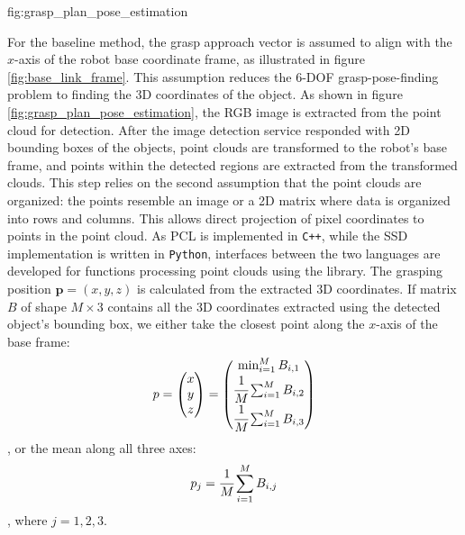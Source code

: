              {fig:grasp_plan_pose_estimation}{\textwidth}

For the baseline method, the grasp approach vector is assumed to align with the $ x $-axis of the robot base coordinate
frame, as illustrated in figure \ref{fig:base_link_frame}. This assumption reduces the 6-DOF grasp-pose-finding problem
to finding the 3D coordinates of the object. As shown in figure \ref{fig:grasp_plan_pose_estimation}, the RGB image is
extracted from the point cloud for detection. After the image detection service responded with 2D bounding boxes of the
objects, point clouds are transformed to the robot's base frame, and points within the detected regions are extracted
from the transformed clouds. This step relies on the second assumption that the point clouds are organized: the points
resemble an image or a 2D matrix where data is organized into rows and columns. This allows direct projection of pixel
coordinates to points in the point cloud. As PCL is implemented in \texttt{C++}, while the SSD implementation is
written in \texttt{Python}, interfaces between the two languages are developed for functions processing point clouds
using the  library. The
grasping position $ \mathbf{p} = (x, y, z) $ is calculated from the extracted 3D coordinates. If matrix $ B $ of shape
$ M \times 3 $ contains all the 3D coordinates extracted using the detected object's bounding box, we either take the
closest point along the $ x $-axis of the base frame:
\begin{equation} \label{eq:pose_estimation_min}
    p = \left( \begin{matrix}
    x \\ y \\ z
    \end{matrix} \right) =
    \left( \begin{matrix}
    \min_{i = 1}^M B_{i,1} \\
    \cfrac{1}{M} \sum_{i = 1}^{M} B_{i,2} \\
    \cfrac{1}{M} \sum_{i = 1}^{M} B_{i,3}
    \end{matrix} \right)
\end{equation}
, or the mean along all three axes:
\begin{equation} \label{eq:pose_estimation_mean}
    p_j = \cfrac{1}{M} \sum_{i = 1}^{M} B_{i,j}
\end{equation}
, where $ j = 1, 2, 3 $.

